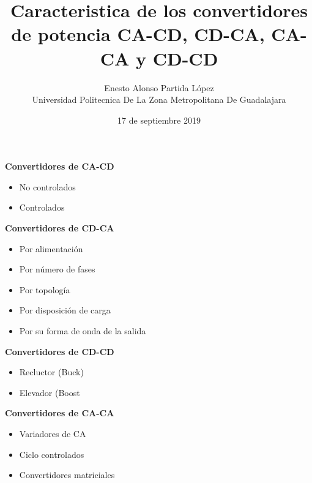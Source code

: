 \documentclass[12pt]{report}
\begin{document}
\title{\textbf{Caracteristica de los convertidores de potencia CA-CD, CD-CA, CA-CA y CD-CD\\}}
\author{Enesto Alonso Partida López\\ Universidad Politecnica De La Zona Metropolitana De Guadalajara\\}
\date{17 de septiembre 2019 }
\maketitle

\newpage
{\huge \textbf{Convertidores de CA-CD}\\}
 
 \begin{itemize}
 \item {\Large No controlados}
 \item {\Large Controlados}
 \end{itemize}
 
{\huge\textbf{Convertidores de CD-CA}\\}

 \begin{itemize}
 \item {\Large Por alimentación}
 \item {\Large Por número de fases}
 \item{\Large Por topología}
 \item{\Large Por disposición de carga}
 \item{\Large Por su forma de onda de la salida}
 \end{itemize}
 
{\huge \textbf{Convertidores de CD-CD}\\}
 
 \begin{itemize}
 \item {\Large Recluctor (Buck)}
 \item {\Large Elevador (Boost}
 \end{itemize}
 
 {\huge \textbf{Convertidores de CA-CA}\\}
 
 \begin{itemize}
 \item {\Large Variadores de CA}
 \item {\Large Ciclo controlados}
 \item {\Large Convertidores matriciales}
 \end{itemize}
 
 \newpage
 
\end{document}
